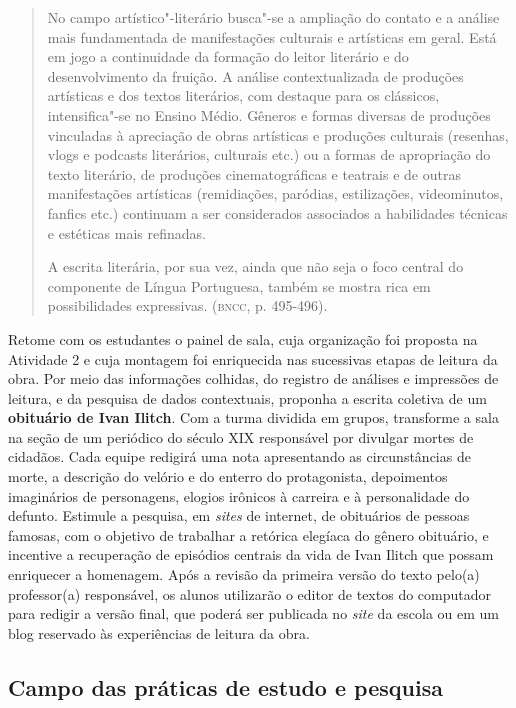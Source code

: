 \documentclass[12pt]{extarticle}
\begin{document}
\begin{quote}
No campo artístico"-literário busca"-se a ampliação do contato e a
análise mais fundamentada de manifestações culturais e artísticas em
geral. Está em jogo a continuidade da formação do leitor literário e do
desenvolvimento da fruição. A análise contextualizada de produções
artísticas e dos textos literários, com destaque para os clássicos,
intensifica"-se no Ensino Médio. Gêneros e formas diversas de produções
vinculadas à apreciação de obras artísticas e produções culturais
(resenhas, vlogs e podcasts literários, culturais etc.) ou a formas de
apropriação do texto literário, de produções cinematográficas e teatrais
e de outras manifestações artísticas (remidiações, paródias,
estilizações, videominutos, fanfics etc.) continuam a ser considerados
associados a habilidades técnicas e estéticas mais refinadas.

A escrita literária, por sua vez, ainda que não seja o foco central do
componente de Língua Portuguesa, também se mostra rica em possibilidades
expressivas. (\textsc{bncc}, p. 495-496).
\end{quote}

Retome com os estudantes o painel de sala, cuja organização foi
proposta na Atividade 2 e cuja montagem foi enriquecida nas sucessivas
etapas de leitura da obra. Por meio das informações colhidas, do
registro de análises e impressões de leitura, e da pesquisa de dados
contextuais, proponha a escrita coletiva de um \textbf{obituário de
Ivan Ilitch}. Com a turma dividida em grupos, transforme a sala na
seção de um periódico do século XIX responsável por divulgar mortes de
cidadãos. Cada equipe redigirá uma nota apresentando as circunstâncias
de morte, a descrição do velório e do enterro do protagonista,
depoimentos imaginários de personagens, elogios irônicos à carreira e
à personalidade do defunto. Estimule a pesquisa, em \emph{sites} de
internet, de obituários de pessoas famosas, com o objetivo de
trabalhar a retórica elegíaca do gênero obituário, e incentive a
recuperação de episódios centrais da vida de Ivan Ilitch que possam
enriquecer a homenagem. Após a revisão da primeira versão do texto
pelo(a) professor(a) responsável, os alunos utilizarão o editor de
textos do computador para redigir a versão final, que poderá ser
publicada no \emph{site} da escola ou em um blog reservado às
experiências de leitura da obra.

\subsection{Campo das práticas de estudo e pesquisa}
\end{document}
